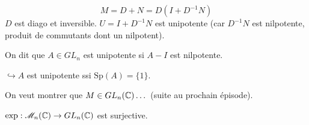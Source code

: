 \[ M = D + N = D ( I + D^{-1} N ) \]
$D$ est diago et inversible.
$U = I + D^{-1} N$ est unipotente (car $D^{-1} N$ est nilpotente, produit de commutants dont un nilpotent).

\begin{definition}{}{}
    On dit que $A \in GL_n$ est unipotente si $A - I$ est nilpotente.
    
    $\hookrightarrow A$ est unipotente ssi $\text{Sp}(A) = \{1\}$.
\end{definition}

On veut montrer que $M \in GL_n(\mathbb{C}) \dots$ (suite au prochain épisode).

\begin{theoreme}{}{}
    $\exp : \mathscr M_n(\mathbb{C}) \to GL_n(\mathbb{C})$ est surjective.
\end{theoreme}

